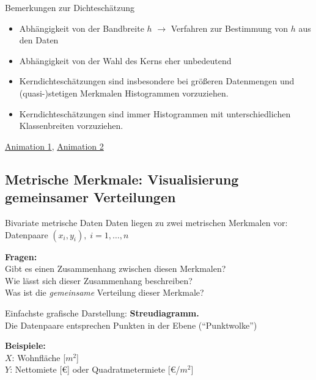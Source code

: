 \documentclass[
  10pt,
  ignorenonframetext,
]{beamer}
\providecommand{\tightlist}{%
  \setlength{\itemsep}{0pt}\setlength{\parskip}{0pt}}
\begin{document}
\begin{frame}{Bemerkungen zur Dichteschätzung}
\label{bemerkungen-zur-dichteschuxe4tzung}
\begin{itemize}
\tightlist
\item
  Abhängigkeit von der Bandbreite \(h\) \(\rightarrow\) Verfahren zur
  Bestimmung von \(h\) aus den Daten
\item
  Abhängigkeit von der Wahl des Kerns eher unbedeutend
\item
  Kerndichteschätzungen sind insbesondere bei größeren Datenmengen und
  (quasi-)stetigen Merkmalen Histogrammen vorzuziehen.
\item
  Kerndichteschätzungen sind immer Histogrammen mit unterschiedlichen
  Klassenbreiten vorzuziehen.
\end{itemize}

\vspace{4em}
\scriptsize

\href{http://varianceexplained.org/files/bandwidth.html}{Animation 1},
\href{http://qingkaikong.blogspot.com/2018/05/kernel-density-estimation-animation.html}{Animation
2}

\scriptsize\normalsize
\end{frame}

\subsection{Metrische Merkmale: Visualisierung gemeinsamer
Verteilungen}\label{metrische-merkmale-visualisierung-gemeinsamer-verteilungen}

\begin{frame}{Bivariate metrische Daten}
\label{bivariate-metrische-daten}
Daten liegen zu zwei metrischen Merkmalen vor:\\
Datenpaare \((x_i,y_i),\; i=1,\ldots,n\)

\textbf{Fragen:}\\
Gibt es einen Zusammenhang zwischen diesen Merkmalen?\\
Wie lässt sich dieser Zusammenhang beschreiben?\\
Was ist die \emph{gemeinsame} Verteilung dieser Merkmale? ~

Einfachste grafische Darstellung: \textbf{Streudiagramm.}\\
Die Datenpaare entsprechen Punkten in der Ebene (``Punktwolke'')

\textbf{Beispiele:}\\
\(X\): Wohnfläche {[}\(m^2\){]}\\
\(Y\): Nettomiete {[}€{]} oder Quadratmetermiete {[}€/\(m^2\){]}
\end{frame}
\end{document}
